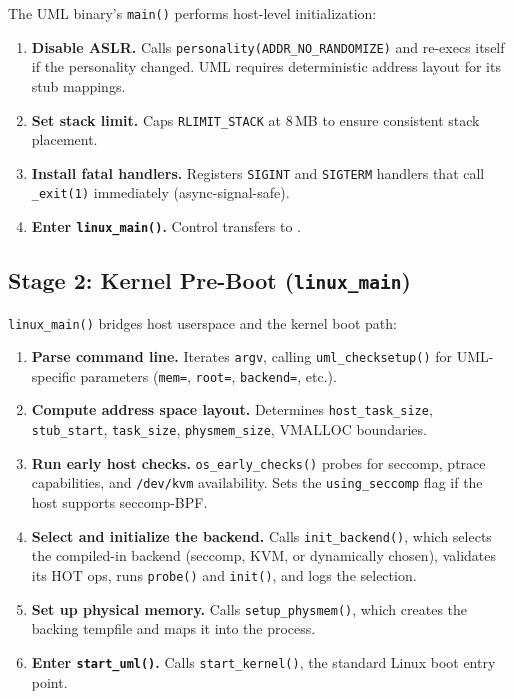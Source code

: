 The UML binary's \texttt{main()} performs host-level initialization:

\begin{enumerate}[nosep]
\item \textbf{Disable ASLR.} Calls \texttt{personality(ADDR\_NO\_RANDOMIZE)}
  and re-execs itself if the personality changed.  UML requires deterministic
  address layout for its stub mappings.
\item \textbf{Set stack limit.} Caps \texttt{RLIMIT\_STACK} at 8\,MB to
  ensure consistent stack placement.
\item \textbf{Install fatal handlers.} Registers \texttt{SIGINT} and
  \texttt{SIGTERM} handlers that call \texttt{\_exit(1)} immediately
  (async-signal-safe).
\item \textbf{Enter \texttt{linux\_main()}.}  Control transfers to
  .
\end{enumerate}

\subsection{Stage 2: Kernel Pre-Boot (\texttt{linux\_main})}
\label{sec:impl-boot-stage2}

\texttt{linux\_main()} bridges host userspace and the kernel boot path:

\begin{enumerate}[nosep]
\item \textbf{Parse command line.}  Iterates \texttt{argv}, calling
  \texttt{uml\_checksetup()} for UML-specific parameters (\texttt{mem=},
  \texttt{root=}, \texttt{backend=}, etc.).
\item \textbf{Compute address space layout.}  Determines
  \texttt{host\_task\_size}, \texttt{stub\_start}, \texttt{task\_size},
  \texttt{physmem\_size}, VMALLOC boundaries.
\item \textbf{Run early host checks.}  \texttt{os\_early\_checks()} probes
  for seccomp, ptrace capabilities, and \texttt{/dev/kvm} availability.  Sets
  the \texttt{using\_seccomp} flag if the host supports seccomp-BPF.
\item \textbf{Select and initialize the backend.}  Calls
  \texttt{init\_backend()}, which selects the compiled-in backend (seccomp,
  KVM, or dynamically chosen), validates its HOT ops, runs \texttt{probe()}
  and \texttt{init()}, and logs the selection.
\item \textbf{Set up physical memory.}  Calls \texttt{setup\_physmem()},
  which creates the backing tempfile and maps it into the process.
\item \textbf{Enter \texttt{start\_uml()}.}  Calls
  \texttt{start\_kernel()}, the standard Linux boot entry point.
\end{enumerate}

